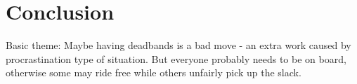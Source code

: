 \section{Conclusion}
Basic theme: Maybe having deadbands is a bad move - an extra work caused by procrastination type of situation.
But everyone probably needs to be on board, otherwise some may ride free while others unfairly pick up the slack.